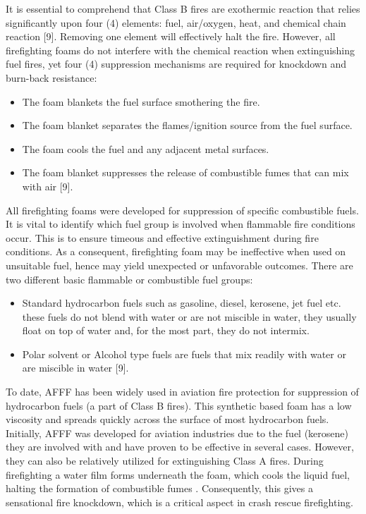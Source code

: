 \documentclass[12pt]{report}
\begin{document}
It is essential to comprehend that Class B fires are exothermic reaction that relies significantly upon four (4) elements: fuel, air/oxygen, heat, and chemical chain reaction [9]. Removing one element will effectively halt the fire.  However, all firefighting foams do not interfere with the chemical reaction when extinguishing fuel fires, yet four (4) suppression mechanisms are required for knockdown and burn-back resistance:

\begin{itemize}
    \item The foam blankets the fuel surface smothering the fire. 
    \item The foam blanket separates the flames/ignition source from the fuel surface. 
    \item The foam cools the fuel and any adjacent metal surfaces. 
    \item The foam blanket suppresses the release of combustible fumes that can mix with air [9]. 
\end{itemize}

All firefighting foams were developed for suppression of specific combustible fuels. It is vital to identify which fuel group is involved when flammable fire conditions occur. This is to ensure timeous and effective extinguishment during fire conditions. As a consequent, firefighting foam may be ineffective when used on unsuitable fuel, hence may yield unexpected or unfavorable outcomes. There are two different basic flammable or combustible fuel groups:

\begin{itemize}
    \item Standard hydrocarbon fuels such as gasoline, diesel, kerosene, jet fuel etc. these fuels do not blend with water or are not miscible in water, they usually float on top of water and, for the most part, they do not intermix.
    \item Polar solvent or Alcohol type fuels are fuels that mix readily with water or are miscible in water [9].
\end{itemize}

To date, AFFF has been widely used in aviation fire protection for suppression of hydrocarbon fuels (a part of Class B fires). This synthetic based foam has a low viscosity and spreads quickly across the surface of most hydrocarbon fuels. Initially, AFFF was developed for aviation industries due to the fuel (kerosene) they are involved with and have proven to be effective in several cases. However, they can also be relatively utilized for extinguishing Class A fires. During firefighting a water film forms underneath the foam, which cools the liquid fuel, halting the formation of combustible fumes \cite{scheffey1995evaluating}. Consequently, this gives a sensational fire knockdown, which is a critical aspect in crash rescue firefighting.
\end{document}
